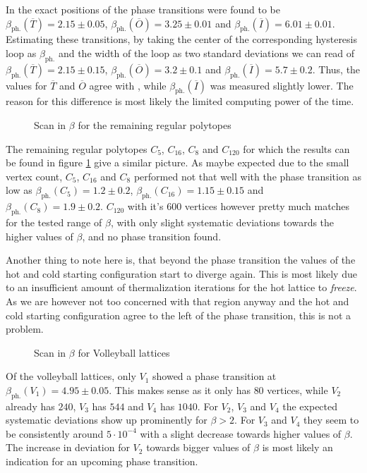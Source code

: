 In \cite{Petcher:1980} the exact positions of the phase transitions were found to be $\beta_{\textrm{ph.}}(\overline{T}) = 2.15 \pm 0.05$, $\beta_{\textrm{ph.}}(\overline{O}) = 3.25 \pm 0.01$ and $\beta_{\textrm{ph.}}(\overline{I}) = 6.01 \pm 0.01$.
Estimating these transitions, by taking the center of the corresponding hysteresis loop as $\beta_{\textrm{ph.}}$ and the width of the loop as two standard deviations we can read of $\beta_{\textrm{ph.}}(\overline{T}) = 2.15 \pm 0.15$, $\beta_{\textrm{ph.}}(\overline{O}) = 3.2 \pm 0.1$ and $\beta_{\textrm{ph.}}(\overline{I}) = 5.7 \pm 0.2$. Thus, the values for $\overline{T}$ and $\overline{O}$ agree with \cite{Petcher:1980}, while $\beta_{\textrm{ph.}}(\overline{I})$ was measured slightly lower. The reason for this difference is most likely the limited computing power of the time.\\
\begin{figure}[!hbt]
 \centering
 
 \caption{Scan in $\beta$ for the remaining regular polytopes}
 \label{plot:regPolytopes}
\end{figure}

The remaining regular polytopes $C_5$, $C_{16}$, $C_8$ and $C_{120}$ for which the results can be found in figure \ref{plot:regPolytopes} give a similar picture. As maybe expected due to the small vertex count, $C_{5}$, $C_{16}$ and $C_{8}$ performed not that well with the phase transition as low as $\beta_{\textrm{ph.}}(C_5) = 1.2 \pm 0.2$, $\beta_{\textrm{ph.}}(C_{16}) = 1.15 \pm 0.15$ and $\beta_{\textrm{ph.}}(C_{8}) = 1.9 \pm 0.2$.
$C_{120}$ with it's 600 vertices however pretty much matches \SUTwo for the tested range of $\beta$, with only slight systematic deviations towards the higher values of $\beta$, and no phase transition found.

Another thing to note here is, that beyond the phase transition the values of the hot and cold starting configuration start to diverge again. This is most likely due to an insufficient amount of thermalization iterations for the hot lattice to \emph{freeze}. As we are however not too concerned with that region anyway and the hot and cold starting configuration agree to the left of the phase transition, this is not a problem.\\

\begin{figure}[!hbt]
 \centering
 
 \caption{Scan in $\beta$ for Volleyball lattices}
\end{figure}
Of the volleyball lattices, only $V_1$ showed a phase transition at $\beta_{\textrm{ph.}}(V_1) = 4.95 \pm 0.05 $. This makes sense as it only has $80$ vertices, while $V_2$ already has $240$, $ V_3 $ has $544$ and $ V_4 $ has $1040$. For $V_2$, $V_3$ and $V_4$ the expected systematic deviations show up prominently for $\beta > 2$. For $V_3$ and $V_4$ they seem to be consistently around $5 \cdot 10^{-4}$ with a slight decrease towards higher values of $\beta$. The increase in deviation for $V_2$ towards bigger values of $\beta$ is most likely an indication for an upcoming phase transition.\\

